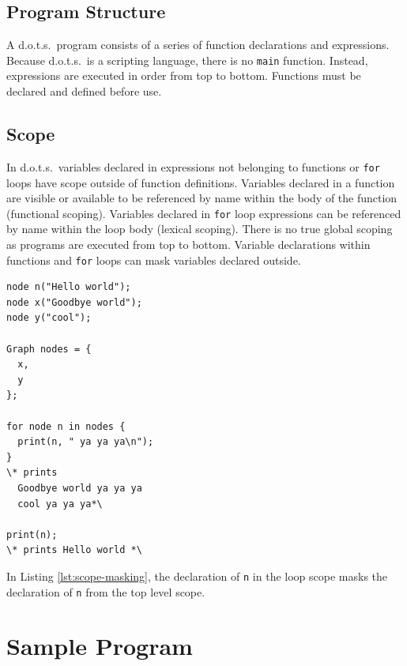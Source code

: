 \documentclass{article}
\newcommand{\pltlang}{d.o.t.s.} %
\newcommand{\code}[1]{\texttt{#1}} %
\begin{document}
\subsection{Program Structure}

A \pltlang\ program consists of a series of function declarations and expressions. Because \pltlang\ is a scripting language, there is no \code{main} function. Instead, expressions are executed in order from top to bottom. Functions must be declared and defined before use. 

\subsection{Scope}

In \pltlang\, variables declared in expressions not belonging to functions or \code{for} loops have scope outside of function definitions. Variables declared in a function are visible or available to be referenced by name within the body of the function (functional scoping). Variables declared in \code{for} loop expressions can be referenced by name within the loop body (lexical scoping). There is no true global scoping as programs are executed from top to bottom. Variable declarations within functions and \code{for} loops can mask variables declared outside.

\begin{lstlisting}[language=pltLang, caption=Example of masking, label=lst:scope-masking]
node n("Hello world");
node x("Goodbye world");
node y("cool");

Graph nodes = {
  x,
  y
};

for node n in nodes {
  print(n, " ya ya ya\n");
}
\* prints
  Goodbye world ya ya ya
  cool ya ya ya*\

print(n);
\* prints Hello world *\
\end{lstlisting}

In Listing \ref{lst:scope-masking}, the declaration of \code{n} in the loop scope masks the declaration of \code{n} from the top level scope.

\section{Sample Program}
\end{document}
